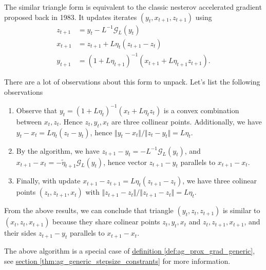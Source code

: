 \documentclass[12pt]{article}
\begin{document}
            \begin{definition}
            \label{def:ag_form_similar_tria_I}
                The similar triangle form is equivalent to the classic nesterov accelerated gradient proposed back in 1983. 
                It updates iterates $(y_t, x_{t + 1}, z_{t + 1})$ using 
                \begin{align*}
                    z_{t + 1} &= y_t - L^{-1} \mathcal G_L(y_t) 
                    \\
                    x_{t + 1} &= z_{t + 1} + L\eta_t (z_{t + 1} - z_t)
                    \\
                    y_{t + 1} &= 
                    (1 + L\eta_{t + 1})^{-1}
                    (x_{t + 1} + L\eta_{t + 1}z_{t + 1}). 
                \end{align*}
            \end{definition}
            \begin{observation}
                There are a lot of observations about this form to unpack. 
                Let's list the following observations
                \begin{enumerate}
                    \item Observe that $y_t = (1 + L\eta_t)^{-1}(x_t + L\eta_t z_t)$ is a convex combination between $x_t, z_t$. Hence $z_t, y_t, x_t$ are three collinear points. Additionally, we have $y_t - x_t = L\eta_t (z_t - y_t)$, hence $\Vert y_t - x_t\Vert/\Vert z_t - y_t\Vert = L\eta_t$. 
                    \item By the algorithm, we have $z_{t + 1} - y_t = - L^{-1} \mathcal G_L(y_t)$, and $x_{t + 1} - x_t = - \tilde \eta_{t + 1} \mathcal G_L(y_t)$, hence vector $z_{t + 1} - y_t$ parallels to $x_{t + 1} - x_t$. 
                    \item Finally, with update $x_{t +1} - z_{t + 1} = L\eta_t (z_{t +1} - z_t)$, we have three colinear points $(z_t, z_{t + 1}, x_t)$ with $\Vert z_{t + 1} - z_t\Vert/\Vert z_{t +1 } - z_t\Vert = L\eta_t$. 
                \end{enumerate}
                From the above results, we can conclude that triangle $(y_t, z_t, z_{t + 1})$ is similar to $(x_t, z_t, x_{t + 1})$ because they share colinear points $z_t, y_t, x_t$ and $z_t, z_{t + 1}, x_{t + 1}$, and their sides $z_{t + 1} - y_t$ parallels to $x_{t + 1} - x_t$. 
            \end{observation}
            \begin{remark}
                The above algorithm is a special case of 
                \hyperref[def:ag_prox_grad_generic]{definition \ref*{def:ag_prox_grad_generic}}, 
                see 
                \hyperref[thm:ag_generic_stepsize_constrants]{section \ref*{thm:ag_generic_stepsize_constrants}} 
                for more information. 
            \end{remark}
\end{document}
